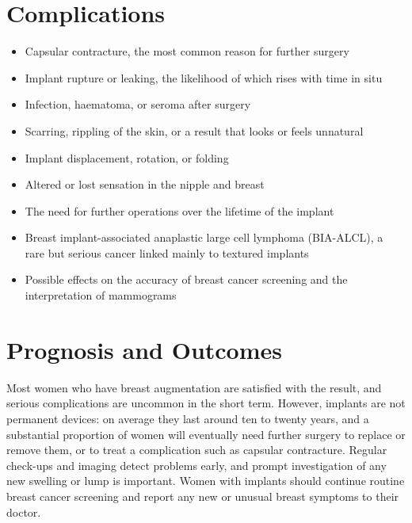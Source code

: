 \section*{Complications}
\begin{itemize}
    \item Capsular contracture, the most common reason for further surgery
    \item Implant rupture or leaking, the likelihood of which rises with time in situ
    \item Infection, haematoma, or seroma after surgery
    \item Scarring, rippling of the skin, or a result that looks or feels unnatural
    \item Implant displacement, rotation, or folding
    \item Altered or lost sensation in the nipple and breast
    \item The need for further operations over the lifetime of the implant
    \item Breast implant-associated anaplastic large cell lymphoma (BIA-ALCL), a rare but serious cancer linked mainly to textured implants
    \item Possible effects on the accuracy of breast cancer screening and the interpretation of mammograms
\end{itemize}

\section*{Prognosis and Outcomes}
Most women who have breast augmentation are satisfied with the result, and serious complications are uncommon in the short term. However, implants are not permanent devices: on average they last around ten to twenty years, and a substantial proportion of women will eventually need further surgery to replace or remove them, or to treat a complication such as capsular contracture. Regular check-ups and imaging detect problems early, and prompt investigation of any new swelling or lump is important. Women with implants should continue routine breast cancer screening and report any new or unusual breast symptoms to their doctor.

